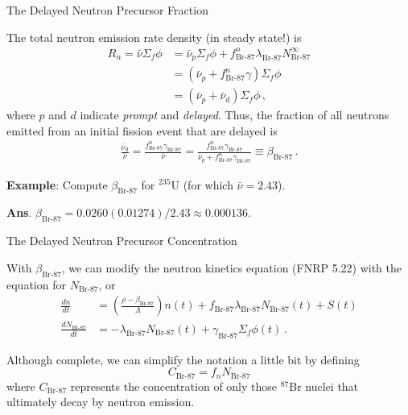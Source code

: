 \documentclass[aspectratio=1610]{beamer}
\begin{document}
\begin{frame}[fragile]{The Delayed Neutron Precursor Fraction}

The total neutron emission rate density (in steady state!) is
\begin{align*}
  R_n 
    = \bar{\nu}\Sigma_f \phi 
    &=  \bar{\nu}_p\Sigma_f \phi + f^n_{\text{Br-87}} \lambda_{\text{Br-87}} N^{\infty}_{\text{Br-87}} \\
    &= (\bar{\nu}_p + f^n_{\text{Br-87}} \gamma)\Sigma_f \phi \\
    &= (\bar{\nu}_p  + \bar{\nu}_d)\Sigma_f \phi  \, ,
\end{align*}
where $p$ and $d$ indicate {\it prompt} and {\it delayed}.
Thus, the fraction of all neutrons emitted from an initial fission event that are delayed is
\begin{align*}
 \frac{ \bar{\nu}_d}{\bar{\nu}} =  \frac{f^n_{\text{Br-87}} \gamma_{\text{Br-87}}}{\bar{\nu}} = \frac{f^n_{\text{Br-87}} \gamma_{\text{Br-87}}}{\bar{\nu}_p + f^n_{\text{Br-87}} \gamma_{\text{Br-87}}} \equiv \beta_{\text{Br-87}} \, .
\end{align*}


{\bf Example}: Compute $\beta_{\text{Br-87}}$ for ${}^{235}$U (for which $\bar{\nu} = 2.43$).

\pause  

{\small {\bf Ans}. $\beta_{\text{Br-87}} = 0.0260(0.01274)/2.43 \approx 0.000136$.
}

\end{frame}


\begin{frame}[fragile]{The Delayed Neutron Precursor Concentration}

With $\beta_{\text{Br-87}}$, we can modify the neutron kinetics equation (FNRP 5.22) with the equation for $N_{\text{Br-87}}$, or 
\begin{align*}
  \frac{dn}{dt} &= 
    \left ( \frac{\rho - \beta_{\text{Br-87}}}{\Lambda} \right ) n(t) +  
       f_{\text{Br-87}} \lambda_{\text{Br-87}} N_{\text{Br-87}} (t) + S(t) \\
  \frac{d N_{\text{Br-87}}}{dt} &= -\lambda_{\text{Br-87}} N_{\text{Br-87}}(t) + \gamma_{\text{Br-87}} \Sigma_f \phi(t) \, .
\end{align*}

Although complete, we can simplify the notation a little bit by defining
\begin{equation*}
    C_{\text{Br-87}} = f_n N_{\text{Br-87}}
\end{equation*}
where $C_{\text{Br-87}}$ represents the concentration of only 
those ${}^{87}$Br nuclei that ultimately decay by neutron emission. 
\end{frame}
\end{document}
